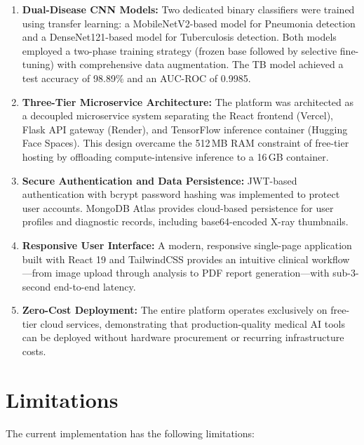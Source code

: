 \documentclass[12pt, a4paper, oneside]{report}
\begin{document}
\begin{enumerate}[label=\arabic*.]
    \item \textbf{Dual-Disease CNN Models:} Two dedicated binary classifiers were trained using transfer learning: a MobileNetV2-based model for Pneumonia detection and a DenseNet121-based model for Tuberculosis detection. Both models employed a two-phase training strategy (frozen base followed by selective fine-tuning) with comprehensive data augmentation. The TB model achieved a test accuracy of 98.89\% and an AUC-ROC of 0.9985.

    \item \textbf{Three-Tier Microservice Architecture:} The platform was architected as a decoupled microservice system separating the React frontend (Vercel), Flask API gateway (Render), and TensorFlow inference container (Hugging Face Spaces). This design overcame the 512\,MB RAM constraint of free-tier hosting by offloading compute-intensive inference to a 16\,GB container.

    \item \textbf{Secure Authentication and Data Persistence:} JWT-based authentication with bcrypt password hashing was implemented to protect user accounts. MongoDB Atlas provides cloud-based persistence for user profiles and diagnostic records, including base64-encoded X-ray thumbnails.

    \item \textbf{Responsive User Interface:} A modern, responsive single-page application built with React 19 and TailwindCSS provides an intuitive clinical workflow---from image upload through analysis to PDF report generation---with sub-3-second end-to-end latency.

    \item \textbf{Zero-Cost Deployment:} The entire platform operates exclusively on free-tier cloud services, demonstrating that production-quality medical AI tools can be deployed without hardware procurement or recurring infrastructure costs.
\end{enumerate}

\section{Limitations}
\label{sec:limitations}

The current implementation has the following limitations:
\end{document}

